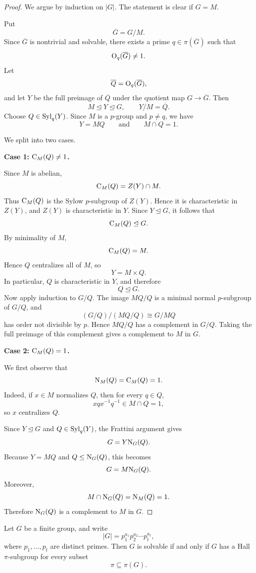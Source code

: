 \begin{proof}
We argue by induction on \(|G|\). The statement is clear if \(G=M\).

Put
\[
    \overline{G}=G/M.
\]
Since \(\overline{G}\) is nontrivial and solvable, there exists a prime
\(q\in \pi(\overline{G})\) such that
\[
    \mathrm{O}_{q}(\overline{G})\neq 1.
\]
Let
\[
    \overline{Q}=\mathrm{O}_{q}(\overline{G}),
\]
and let \(Y\) be the full preimage of \(\overline{Q}\) under the quotient map
\(G\to \overline{G}\). Then
\[
    M\trianglelefteq Y\trianglelefteq G,
    \qquad
    Y/M=\overline{Q}.
\]
Choose \(Q\in \operatorname{Syl}_q(Y)\). Since \(M\) is a \(p\)-group and \(p\neq q\), we have
\[
    Y=MQ
    \qquad\text{and}\qquad
    M\cap Q=1.
\]

We split into two cases.

\medskip

\noindent
\textbf{Case 1: \(\mathrm{C}_{M}(Q)\neq 1\).}

Since \(M\) is abelian,
\[
    \mathrm{C}_{M}(Q)=Z(Y)\cap M.
\]
Thus \(\mathrm{C}_{M}(Q)\) is the Sylow \(p\)-subgroup of \(Z(Y)\). Hence it is
characteristic in \(Z(Y)\), and \(Z(Y)\) is characteristic in \(Y\). Since
\(Y\trianglelefteq G\), it follows that
\[
    \mathrm{C}_{M}(Q)\trianglelefteq G.
\]
By minimality of \(M\),
\[
    \mathrm{C}_{M}(Q)=M.
\]
Hence \(Q\) centralizes all of \(M\), so
\[
    Y=M\times Q.
\]
In particular, \(Q\) is characteristic in \(Y\), and therefore
\[
    Q\trianglelefteq G.
\]
Now apply induction to \(G/Q\). The image \(MQ/Q\) is a minimal normal
\(p\)-subgroup of \(G/Q\), and
\[
    (G/Q)/(MQ/Q)\cong G/MQ
\]
has order not divisible by \(p\). Hence \(MQ/Q\) has a complement in \(G/Q\).
Taking the full preimage of this complement gives a complement to \(M\) in \(G\).

\medskip

\noindent
\textbf{Case 2: \(\mathrm{C}_{M}(Q)=1\).}

We first observe that
\[
    \mathrm{N}_{M}(Q)=\mathrm{C}_{M}(Q)=1.
\]
Indeed, if \(x\in M\) normalizes \(Q\), then for every \(q\in Q\),
\[
    xqx^{-1}q^{-1}\in M\cap Q=1,
\]
so \(x\) centralizes \(Q\).

Since \(Y\trianglelefteq G\) and \(Q\in \operatorname{Syl}_q(Y)\), the Frattini argument gives
\[
    G=Y\mathrm{N}_{G}(Q).
\]
Because \(Y=MQ\) and \(Q\leq \mathrm{N}_{G}(Q)\), this becomes
\[
    G=M\mathrm{N}_{G}(Q).
\]
Moreover,
\[
    M\cap \mathrm{N}_{G}(Q)=\mathrm{N}_{M}(Q)=1.
\]
Therefore \(\mathrm{N}_{G}(Q)\) is a complement to \(M\) in \(G\).
\end{proof}

\begin{theorem}
Let \(G\) be a finite group, and write
\[
    |G|=p_1^{a_1}p_2^{a_2}\cdots p_t^{a_t},
\]
where \(p_1,\ldots,p_t\) are distinct primes. Then \(G\) is solvable if and only if
\(G\) has a Hall \(\pi\)-subgroup for every subset
\[
    \pi\subseteq \pi(G).
\]
\end{theorem}


